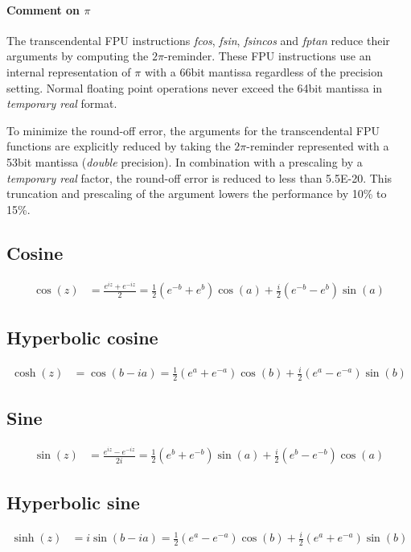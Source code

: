 \documentclass[11pt,a4paper,twoside]{article}
\begin{document}
\paragraph{Comment on $\pi$}
The transcendental FPU instructions \textit{fcos}, \textit{fsin}, \textit{fsincos} and \textit{fptan} reduce their arguments by computing the $2\pi$-reminder.
These FPU instructions use an internal representation of $\pi$ with a 66bit mantissa regardless of the precision setting.
Normal floating point operations never exceed the 64bit mantissa in \textit{temporary real} format.

To minimize the round-off error, the arguments for the transcendental FPU functions are explicitly reduced by taking the $2\pi$-reminder represented with a 53bit mantissa (\textit{double} precision).
In combination with a prescaling by a \textit{temporary real} factor, the round-off error is reduced to less than 5.5E-20.
This truncation and prescaling of the argument lowers the performance by 10\% to 15\%.

\subsection{Cosine}
\begin{align}
	\cos{(z)}	& = \frac{e^{iz} + e^{-iz}}{2} = \frac{1}{2}\left(e^{-b} + e^b\right)\cos{(a)} + \frac{i}{2}\left(e^{-b} - e^b\right)\sin{(a)}
\end{align}

\subsection{Hyperbolic cosine}
\begin{align}
	\cosh{(z)}	& = \cos{(b - ia)} = \frac{1}{2}\left(e^a + e^{-a}\right)\cos{(b)} + \frac{i}{2}\left(e^a - e^{-a}\right)\sin{(b)}
\end{align}

\subsection{Sine}
\begin{align}
	\sin{(z)}	& = \frac{e^{iz} - e^{-iz}}{2i} = \frac{1}{2}\left(e^b + e^{-b}\right)\sin{(a)} + \frac{i}{2}\left(e^b - e^{-b}\right)\cos{(a)}
\end{align}

\subsection{Hyperbolic sine}
\begin{align}
	\sinh{(z)}	& = i\sin{(b - ia)} = \frac{1}{2}\left(e^a - e^{-a}\right)\cos{(b)} + \frac{i}{2}\left(e^a + e^{-a}\right)\sin{(b)}
\end{align}
\end{document}
